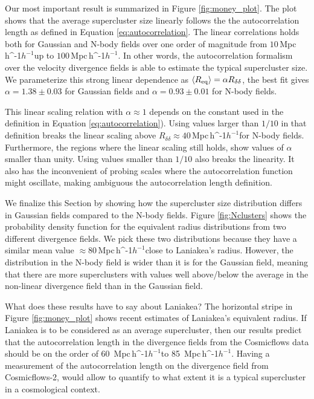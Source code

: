 \documentclass[usenatbib]{mnras}
\newcommand{\Mpch}{\,{\rm Mpc}\,\ifmmode h^{-1}\else $h^{-1}$\fi}
\begin{document}
Our most important result is summarized in Figure \ref{fig:money_plot}.
The plot shows that 
the average supercluster size linearly follows the the autocorrelation length as defined in Equation \ref{eq:autocorrelation}.
The linear correlations holds both for Gaussian and N-body fields over one order of magnitude from $10$\Mpch up to $100$\Mpch.
In other words, the autocorrelation formalism over the velocity divergence fields is able to estimate the typical supercluster size.
We parameterize this strong linear dependence  as 
$\langle R_{\rm{eq}}\rangle=\alpha R_{\delta\delta}$, the best fit gives $\alpha=1.38\pm0.03$ for Gaussian fields and $\alpha=0.93\pm 0.01$ for N-body fields.

This linear scaling relation with $\alpha\approx 1$ depends on the constant used in the definition in Equation \ref{eq:autocorrelation}). 
Using values larger than $1/10$ in that definition breaks the linear scaling above $R_{\delta\delta}\approx 40$\Mpch for N-body fields. 
Furthermore, the regions where the linear scaling still holds, show values of $\alpha$ smaller than unity. 
Using values smaller than $1/10$ also breaks the linearity. 
It also has the inconvenient of probing scales where the autocorrelation function might oscillate, making ambiguous the autocorrelation length definition.
    
We finalize this Section by showing how the supercluster size distribution differs in Gaussian fields compared to the N-body fields.
Figure \ref{fig:Nclusters} shows the probability density function for the equivalent radius distributions from two different divergence fields.
We pick these two distributions because they have a similar mean value $\approx80$\Mpch close to Laniakea's radius. 
However, the distribution in the N-body field is wider than it is for the Gaussian field, meaning that there are more superclusters with values well above/below the average in the non-linear divergence field than in the Gaussian field. 


What does these results have to say about Laniakea?
The horizontal stripe in Figure \ref{fig:money_plot} shows recent estimates of Laniakea's equivalent radius. 
If Laniakea is to be considered as an average supercluster, then our results predict that the autocorrelation length in the divergence fields from the Cosmicflows data should be on the order of 60 \Mpch to 85 \Mpch.
Having a measurement of the autocorrelation length on the divergence field from Cosmicflows-2, would allow to quantify to what extent it is a typical supercluster in a cosmological context.
 
\end{document}
